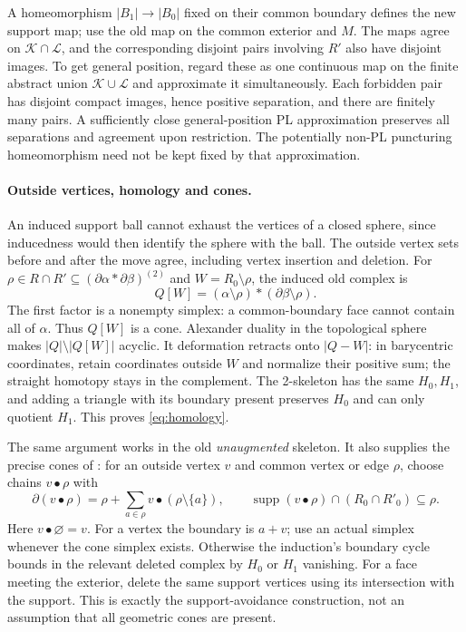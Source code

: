 \documentclass[11pt]{article}
\theoremstyle{remark}
\newcommand{\supp}{\operatorname{supp}}
\begin{document}
A homeomorphism $|B_1|\to|B_0|$ fixed on their common boundary defines
the new support map; use the old map on the common exterior and $M$.
The maps agree on $\mathcal K\cap\mathcal L$, and the corresponding
disjoint pairs involving $R'$ also have disjoint images. To get
general position, regard these as one continuous map on the finite
abstract union $\mathcal K\cup\mathcal L$ and approximate it
simultaneously. Each forbidden pair has disjoint compact images,
hence positive separation, and there are finitely many pairs. A
sufficiently close general-position PL approximation preserves all
separations and agreement upon restriction. The potentially non-PL
puncturing homeomorphism need not be kept fixed by that approximation.

\paragraph{Outside vertices, homology and cones.}
An induced support ball cannot exhaust the vertices of a closed
sphere, since inducedness would then identify the sphere with the
ball. The outside vertex sets before and after the move agree,
including vertex insertion and deletion.
For $\rho\in R\cap R'\subseteq(\partial\alpha*\partial\beta)^{(2)}$
and $W=R_0\setminus\rho$, the induced old complex is
\[
Q[W]=(\alpha\setminus\rho)*(\partial\beta\setminus\rho).
\]
The first factor is a nonempty simplex: a common-boundary face cannot
contain all of $\alpha$. Thus $Q[W]$ is a cone. Alexander duality in
the topological sphere makes $|Q|\setminus|Q[W]|$ acyclic.
It deformation retracts onto $|Q-W|$: in barycentric coordinates,
retain coordinates outside $W$ and normalize their positive sum;
the straight homotopy stays in the complement. The 2-skeleton has
the same $H_0,H_1$, and adding a triangle with its boundary present
preserves $H_0$ and can only quotient $H_1$. This proves
\eqref{eq:homology}.

The same argument works in the old \emph{unaugmented} skeleton. It
also supplies the precise cones of \cite[Lemma~5.2]{NW}: for an
outside vertex $v$ and common vertex or edge $\rho$, choose chains
$v\bullet\rho$ with
\begin{equation}\label{eq:cone}
\partial(v\bullet\rho)=\rho+
 \sum_{a\in\rho}v\bullet(\rho\setminus\{a\}),\qquad
\supp(v\bullet\rho)\cap(R_0\cap R'_0)\subseteq\rho.
\end{equation}
Here $v\bullet\varnothing=v$. For a vertex the boundary is $a+v$;
use an actual simplex whenever
the cone simplex exists. Otherwise the induction's boundary cycle
bounds in the relevant deleted complex by $H_0$ or $H_1$ vanishing.
For a face meeting the exterior, delete the same support vertices
using its intersection with the support. This is exactly the
support-avoidance construction, not an assumption that all geometric
cones are present.
\end{document}
